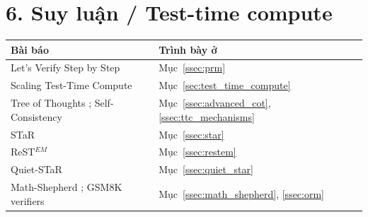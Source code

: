 \section*{6. Suy luận / Test-time compute}
\begin{longtable}{@{}p{7.2cm}p{7.6cm}@{}}
\toprule
\textbf{Bài báo} & \textbf{Trình bày ở} \\
\midrule
\endhead
Let's Verify Step by Step \cite{lightman2024verify} & Mục~\ref{ssec:prm} \\
Scaling Test-Time Compute \cite{snell2024scaling} & Mục~\ref{sec:test_time_compute} \\
Tree of Thoughts \cite{yao2023tree}; Self-Consistency \cite{wang2022self} & Mục~\ref{ssec:advanced_cot}, \ref{ssec:ttc_mechanisms} \\
STaR \cite{zelikman2022star} & Mục~\ref{ssec:star} \\
ReST$^{EM}$ \cite{singh2024restem} & Mục~\ref{ssec:restem} \\
Quiet-STaR \cite{zelikman2024quietstar} & Mục~\ref{ssec:quiet_star} \\
Math-Shepherd \cite{wang2024mathshepherd}; GSM8K verifiers \cite{cobbe2021gsm8k} & Mục~\ref{ssec:math_shepherd}, \ref{ssec:orm} \\
\bottomrule
\end{longtable}

